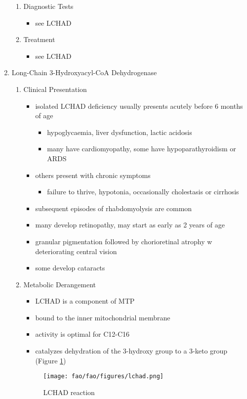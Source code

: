 \documentclass{scrartcl}
\begin{document}
\begin{enumerate}
\begin{enumerate}
\item Diagnostic Tests
\label{sec:orgc372d57}
\begin{itemize}
\item see LCHAD
\end{itemize}

\item Treatment
\label{sec:org0d43152}
\begin{itemize}
\item see LCHAD
\end{itemize}
\end{enumerate}

\item Long-Chain 3-Hydroxyacyl-CoA Dehydrogenase
\label{sec:org6ed8f86}
\begin{enumerate}
\item Clinical Presentation
\label{sec:org06c9bfa}
\begin{itemize}
\item isolated LCHAD deficiency usually presents acutely before 6 months of age
\begin{itemize}
\item hypoglycaemia, liver dysfunction, lactic acidosis
\item many have cardiomyopathy, some have hypoparathyroidism or ARDS
\end{itemize}
\item others present with chronic symptoms
\begin{itemize}
\item failure to thrive, hypotonia, occasionally cholestasis or cirrhosis
\end{itemize}
\item subsequent episodes of rhabdomyolysis are common
\item many develop retinopathy, may start as early as 2 years of age
\item granular pigmentation followed by chorioretinal atrophy w deteriorating central vision
\item some develop cataracts
\end{itemize}
\item Metabolic Derangement
\label{sec:org33616e5}
\begin{itemize}
\item LCHAD is a component of MTP
\item bound to the inner mitochondrial membrane
\item activity is optimal for C12-C16
\item catalyzes dehydration of the 3-hydroxy group to a 3-keto group
(Figure \ref{fig:org728102a})
\end{itemize}
\begin{figure}[htbp]
\centering
\texttt{[image: fao/fao/figures/lchad.png]}
\caption{\label{fig:org728102a}LCHAD reaction}
\end{figure}


\end{enumerate}
\end{enumerate}
\end{document}
